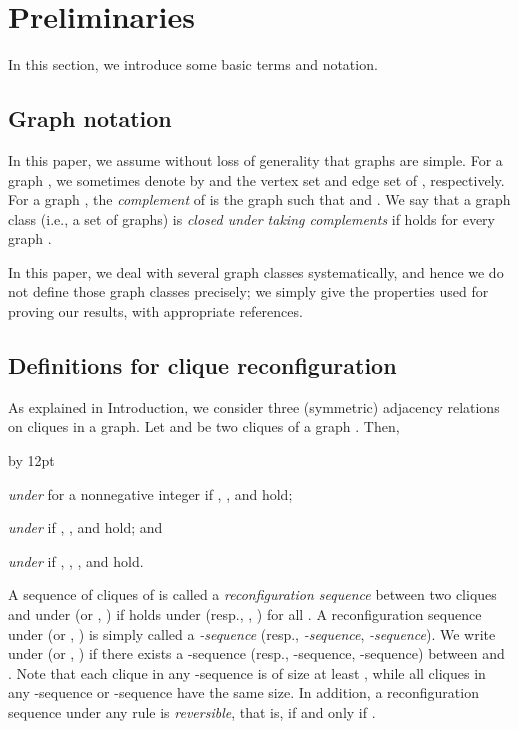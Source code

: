 \documentclass{llncs}
\newenvironment{listing}[1]{\begin{list}{*}{\settowidth{\labelwidth}{#1}\setlength{\leftmargin}{\labelwidth}\advance \leftmargin by 12pt
\setlength{\itemsep}{0pt}\setlength{\parsep}{0pt}\setlength{\topsep}{0pt}\setlength{\parskip}{0pt}}}{\end{list}}
\newcounter{two}
\newcounter{three}
\begin{document}
	\section{Preliminaries}
	In this section, we introduce some basic terms and notation. 

\subsection{Graph notation}

	In this paper, we assume without loss of generality that graphs are simple.
	For a graph , we sometimes denote by  and  the vertex set and edge set of , respectively. 
For a graph , the \emph{complement}  of  is the graph such that  and .
	We say that a graph class  (i.e., a set of graphs) is \emph{closed under taking complements} if  holds for every graph . 


	In this paper, we deal with several graph classes systematically, and hence we do not define those graph classes precisely;
we simply give the properties used for proving  our results, with appropriate references. 

\subsection{Definitions for {\sc clique reconfiguration}}

	As explained in Introduction, we consider three (symmetric) adjacency relations on cliques in a graph.
	Let  and  be two cliques of a graph .
	Then,
	\begin{listing}{a}
	\item[] \emph{ under } for a nonnegative integer  if , , and  hold;
	\smallskip

	\item[] \emph{ under } if , , and  hold; and
	\smallskip

	\item[] \emph{ under } if , , , and  hold.
	\smallskip
	\end{listing}
	A sequence  of cliques of  is called a {\em reconfiguration sequence} between two cliques  and  under  (or , ) if  holds under  (resp., , ) for all .
	A reconfiguration sequence under  (or , ) is simply called a \emph{-sequence} (resp., \emph{-sequence}, \emph{-sequence}).
	We write  under  (or , ) if there exists a -sequence (resp., -sequence, -sequence) between  and .
	Note that each clique in any -sequence is of size at least , while all cliques in any -sequence or -sequence have the same size.
	In addition, a reconfiguration sequence under any rule is {\em reversible}, that is,  if and only if .
\end{document}
